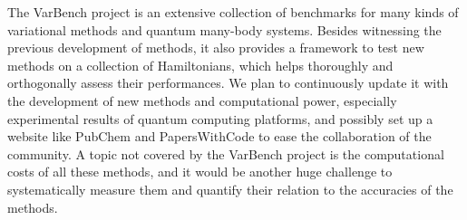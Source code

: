 The VarBench project is an extensive collection of benchmarks for many kinds of variational methods and quantum many-body systems. Besides witnessing the previous development of methods, it also provides a framework to test new methods on a collection of Hamiltonians, which helps thoroughly and orthogonally assess their performances. We plan to continuously update it with the development of new methods and computational power, especially experimental results of quantum computing platforms, and possibly set up a website like PubChem and PapersWithCode to ease the collaboration of the community. A topic not covered by the VarBench project is the computational costs of all these methods, and it would be another huge challenge to systematically measure them and quantify their relation to the accuracies of the methods.
